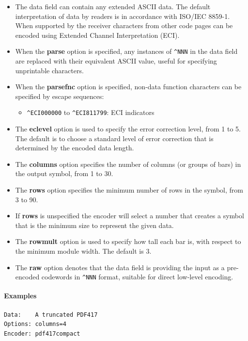 \begin{itemize}
\tightlist
\item
  The data field can contain any extended ASCII data. The default
  interpretation of data by readers is in accordance with ISO/IEC
  8859-1. When supported by the receiver characters from other code
  pages can be encoded using Extended Channel Interpretation (ECI).
\item
  When the \textbf{parse} option is specified, any instances of
  \texttt{\^{}NNN} in the data field are replaced with their equivalent
  ASCII value, useful for specifying unprintable characters.
\item
  When the \textbf{parsefnc} option is specified, non-data function
  characters can be specified by escape sequences:

  \begin{itemize}
  \tightlist
  \item
    \texttt{\^{}ECI000000} to \texttt{\^{}ECI811799}: ECI indicators
  \end{itemize}
\item
  The \textbf{eclevel} option is used to specify the error correction
  level, from 1 to 5. The default is to choose a standard level of error
  correction that is determined by the encoded data length.
\item
  The \textbf{columns} option specifies the number of columns (or groups
  of bars) in the output symbol, from 1 to 30.
\item
  The \textbf{rows} option specifies the minimum number of rows in the
  symbol, from 3 to 90.
\item
  If \textbf{rows} is unspecified the encoder will select a number that
  creates a symbol that is the minimum size to represent the given data.
\item
  The \textbf{rowmult} option is used to specify how tall each bar is,
  with respect to the minimum module width. The default is 3.
\item
  The \textbf{raw} option denotes that the data field is providing the
  input as a pre-encoded codewords in \texttt{\^{}NNN} format, suitable
  for direct low-level encoding.
\end{itemize}

\hypertarget{examples-12}{%
\paragraph{Examples}\label{examples-12}}

\begin{verbatim}
Data:    A truncated PDF417
Options: columns=4
Encoder: pdf417compact
\end{verbatim}

